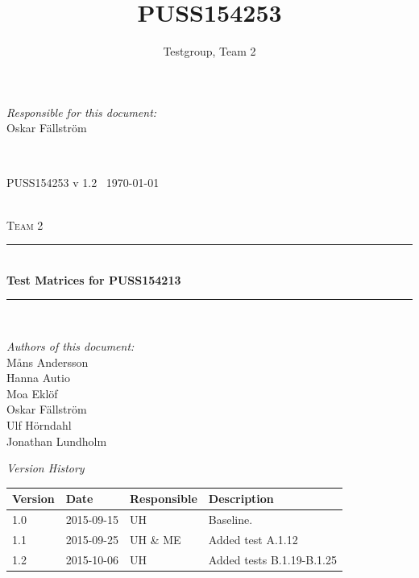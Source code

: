 \documentclass[a4paper]{article}
\title{PUSS154253}
\author{Testgroup, Team 2}
\newcommand{\version}{v 1.2}
\newcommand{\SVVS}{PUSS154213}
\begin{document}
\begin{titlepage}
\newcommand{\HRule}{\rule{\linewidth}{0.5mm}}

\begin{minipage}{0.5\textwidth}
\begin{flushleft} %
\textit{Responsible for this document:}\\
Oskar Fällström %
\end{flushleft}
\end{minipage}
~
\begin{minipage}{0.4\textwidth}
\begin{flushright}
PUSS154253 \version\  %
\today
\end{flushright}
\end{minipage}\\[3cm]

\centering
\textsc{\LARGE Team 2}\\[0.5cm]

\HRule \\[0.4cm]
{ \huge \bfseries Test Matrices for \SVVS\ }\\[0.4cm] %
\HRule \\[1.5cm]

\vfill
\begin{flushleft}
\textit{Authors of this document:}\\
Måns Andersson \\
Hanna Autio \\
Moa Eklöf \\
Oskar Fällström \\
Ulf Hörndahl \\
Jonathan Lundholm
\end{flushleft}


\end{titlepage}

\begin{center}
\textit{\large Version History}

    \begin{tabular}{ | l | l | l | p{5cm} |}
    \hline
    \textbf{Version} 	& \textbf{Date} 	& \textbf{Responsible} 	& \textbf{Description} 		\\ \hline
    1.0				 	& 2015-09-15 			& UH 					&  Baseline. 				\\ \hline
    1.1					& 2015-09-25			& UH \& ME			&  Added test A.1.12 \\ \hline
    1.2					& 2015-10-06			& UH 					& Added tests B.1.19-B.1.25 \\ \hline
    \end{tabular}
\end{center}
\end{document}
